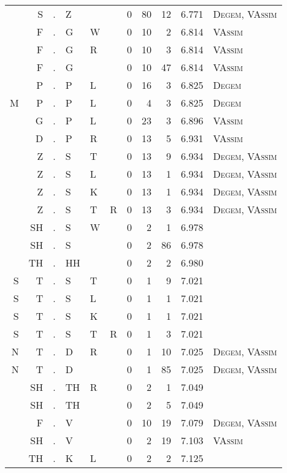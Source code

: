 \begin{longtable}{r@{ } r@{ } c@{ } l@{ } l@{ } l@{ } r r r r l }
  & S & . & Z &   &   & 0 & 80 & 12 & 6.771 & \textsc{Degem}, \textsc{VAssim} \\
  & F & . & G & W &   & 0 & 10 & 2 & 6.814 & \textsc{VAssim} \\
  & F & . & G & R &   & 0 & 10 & 3 & 6.814 & \textsc{VAssim} \\
  & F & . & G &   &   & 0 & 10 & 47 & 6.814 & \textsc{VAssim} \\
  & P & . & P & L &   & 0 & 16 & 3 & 6.825 & \textsc{Degem} \\
M & P & . & P & L &   & 0 & 4 & 3 & 6.825 & \textsc{Degem} \\
  & G & . & P & L &   & 0 & 23 & 3 & 6.896 & \textsc{VAssim} \\
  & D & . & P & R &   & 0 & 13 & 5 & 6.931 & \textsc{VAssim} \\
  & Z & . & S & T &   & 0 & 13 & 9 & 6.934 & \textsc{Degem}, \textsc{VAssim} \\
  & Z & . & S & L &   & 0 & 13 & 1 & 6.934 & \textsc{Degem}, \textsc{VAssim} \\
  & Z & . & S & K &   & 0 & 13 & 1 & 6.934 & \textsc{Degem}, \textsc{VAssim} \\
  & Z & . & S & T & R & 0 & 13 & 3 & 6.934 & \textsc{Degem}, \textsc{VAssim} \\
  & SH & . & S & W &   & 0 & 2 & 1 & 6.978 &  \\
  & SH & . & S &   &   & 0 & 2 & 86 & 6.978 &  \\
  & TH & . & HH &   &   & 0 & 2 & 2 & 6.980 &  \\
S & T & . & S & T &   & 0 & 1 & 9 & 7.021 &  \\
S & T & . & S & L &   & 0 & 1 & 1 & 7.021 &  \\
S & T & . & S & K &   & 0 & 1 & 1 & 7.021 &  \\
S & T & . & S & T & R & 0 & 1 & 3 & 7.021 &  \\
N & T & . & D & R &   & 0 & 1 & 10 & 7.025 & \textsc{Degem}, \textsc{VAssim} \\
N & T & . & D &   &   & 0 & 1 & 85 & 7.025 & \textsc{Degem}, \textsc{VAssim} \\
  & SH & . & TH & R &   & 0 & 2 & 1 & 7.049 &  \\
  & SH & . & TH &   &   & 0 & 2 & 5 & 7.049 &  \\
  & F & . & V &   &   & 0 & 10 & 19 & 7.079 & \textsc{Degem}, \textsc{VAssim} \\
  & SH & . & V &   &   & 0 & 2 & 19 & 7.103 & \textsc{VAssim} \\
  & TH & . & K & L &   & 0 & 2 & 2 & 7.125 &  \\

\end{longtable}
